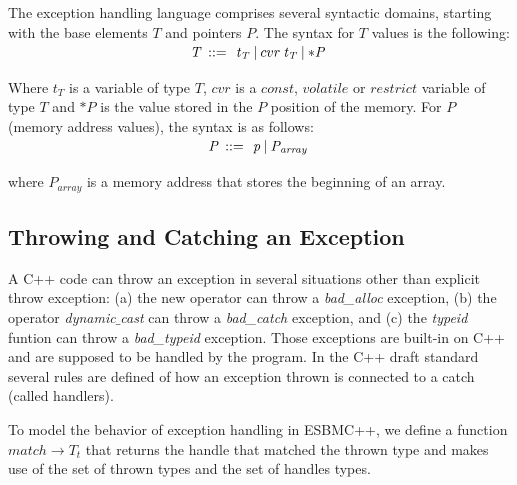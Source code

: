 \documentclass[conference]{IEEEtran}
\begin{document}
{The exception handling language comprises several syntactic domains,
starting with the base elements $\mathit{T}$ and pointers $\mathit{P}$.
The syntax for $\mathit{T}$ values is the following:
%
\[\begin{array}{r@{\:\:}c@{\:\:}l}\label{element-semantics}
\\[-5ex]
\mathit{T}   & ::= & \: \mathit{t_T} \: | \: cvr \: \mathit{t_T} \: | \: \mathit{*P} \: \\
\end{array}
\]
%
Where $\mathit{t_T}$ is a variable of type $\mathit{T}$, $cvr$ is a $const$,
$volatile$ or $restrict$ variable of type $\mathit{T}$ and $\mathit{*P}$
is the value stored in the $\mathit{P}$ position of the memory.
For $\mathit{P}$ (memory address values), the syntax is as follows:
%
\[\begin{array}{r@{\:\:}c@{\:\:}l}\label{pointer-semantics}
\\[-5ex]
\mathit{P}  & ::= & \: \mathit{p} \: | \: \mathit{P_{array}} \: \\
\end{array}
\]
%
where $\mathit{P_{array}}$ is a memory address that stores the beginning
of an array.

\subsection{Throwing and Catching an Exception}

A C++ code can throw an exception in several situations other
than explicit throw exception: (a) the new operator can throw
a \textit{bad\_alloc} exception, (b) the operator
\textit{dynamic$\_$cast} can throw a \textit{bad\_catch}
exception, and (c) the \textit{typeid} funtion can throw a
\textit{bad\_typeid} exception.
Those exceptions are built-in on C++ and are supposed to be
handled by the program. In the C++ draft standard~\cite{CppDraft}
several rules are defined of how an exception
thrown is connected to a catch (called handlers).

To model the behavior of exception handling in ESBMC++, we define a function
$match \rightarrow T_t$ that returns the handle that matched the thrown type
and makes use of the set of thrown types and the set of handles types.

}
\end{document}
